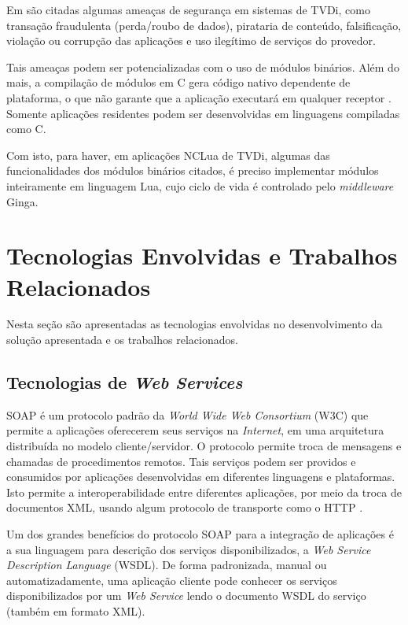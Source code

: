 Em \cite{braga-introducao} são citadas algumas ameaças de segurança em sistemas de TVDi, como 
transação fraudulenta (perda/roubo de dados), pirataria de conteúdo,  falsificação, violação ou corrupção das aplicações 
e uso ilegítimo de serviços do provedor.

Tais ameaças podem ser potencializadas com o uso de módulos binários. Além do mais, a compilação de módulos em C gera código nativo dependente de plataforma, o que não garante que a aplicação executará em qualquer receptor \cite{costa-seguranca}.
Somente aplicações residentes podem ser desenvolvidas em linguagens compiladas como C.

Com isto, para haver, em aplicações NCLua de TVDi, algumas das funcionalidades dos módulos binários citados, é preciso
implementar módulos inteiramente em linguagem Lua, cujo ciclo de vida é controlado pelo \textit{middleware} Ginga\cite{abnt200815606}.

\section{Tecnologias Envolvidas e Trabalhos Relacionados} \label{sec:trabs-rel}

Nesta seção são apresentadas as tecnologias envolvidas no desenvolvimento da solução
apresentada e os trabalhos relacionados.

\subsection{Tecnologias de \textit{Web Services}} \label{sec:ws}

SOAP é um protocolo padrão da \textit{World Wide Web Consortium} (W3C) que permite a aplicações oferecerem seus serviços na \textit{Internet}, em uma arquitetura distribuída no modelo cliente/servidor. O protocolo permite troca de mensagens e chamadas de procedimentos remotos. 
Tais serviços podem ser providos e consumidos por aplicações desenvolvidas em diferentes linguagens e plataformas. 
Isto permite a interoperabilidade entre diferentes aplicações, por meio da troca de documentos XML, 
usando algum protocolo de transporte como o HTTP \cite{soap-spec} \cite{curbera2002unraveling} \cite{newcomer2002understanding}.

Um dos grandes benefícios do protocolo SOAP para a integração de aplicações é a 
sua linguagem para descrição dos serviços disponibilizados, a \textit{Web Service Description Language} (WSDL).
De forma padronizada, manual ou automatizadamente, uma aplicação cliente pode conhecer os serviços
disponibilizados por um \textit{Web Service} lendo o documento WSDL do serviço (também em formato XML)\cite{soap-spec}.

